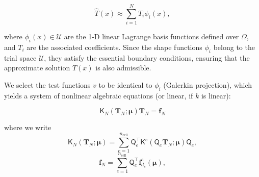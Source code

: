 \documentclass[11pt]{article}
\renewcommand{\vec}[1]{\mathbf{#1}}
\newcommand{\mat}[1]{\mathsf{#1}}
\begin{document}
    \begin{equation}
    \widehat{T}(x) \approx \sum_{i=1}^{N} T_i \phi_i(x),
    \label{eq:FE_shape}
    \end{equation}

    where \( \phi_i(x) \in \mathcal{U} \) are the 1-D linear Lagrange basis functions  defined over \( \Omega \), and \( T_i \) are the associated coefficients.
    Since the shape functions \( \phi_i \) belong to the trial space \( \mathcal{U} \), they satisfy the essential boundary conditions, ensuring that the approximate solution \( T(x) \) is also admissible.

    We select the test functions \( v \) to be identical to \( \phi_i \) (Galerkin projection), which yields a system of nonlinear algebraic equations (or linear, if \( k \) is linear):

    \begin{equation}
    \mat{K}_N(\vec{T}_N;\boldsymbol\mu) \vec{T}_N = \vec{f}_N
    \label{eq:HC_HDM}
    \end{equation}






    where we write
    \begin{equation}
    \mat{K}_N(\mathbf{T}_N; \boldsymbol\mu) = \sum_{e=1}^{n_{\text{cell}}} \mat{Q}_e^\top \mat{K}^e (\mat{Q}_e\mathbf{T}_N; \boldsymbol\mu) \mat{Q}_e,
    \label{eq:elemental_contrib_K}
    \end{equation}
    \begin{equation}
    \mathbf{f}_N = \sum_{e=1}^{n_{\text{cell}}} \mat{Q}_e^\top \vec{f}^e_{d_e}(\boldsymbol\mu),
    \label{eq:elemental_contrib_f}
    \end{equation}
\end{document}
